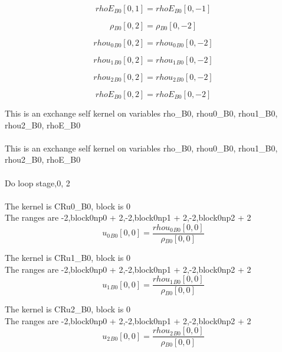\documentclass{article}
\begin{document}
\begin{dmath}{rhoE{_{B0}}}[{0,1}] = {rhoE{_{B0}}}[{0,-1}]\end{dmath}

\begin{dmath}{\rho{_{B0}}}[{0,2}] = {\rho{_{B0}}}[{0,-2}]\end{dmath}

\begin{dmath}{rhou_{0}{_{B0}}}[{0,2}] = {rhou_{0}{_{B0}}}[{0,-2}]\end{dmath}

\begin{dmath}{rhou_{1}{_{B0}}}[{0,2}] = {rhou_{1}{_{B0}}}[{0,-2}]\end{dmath}

\begin{dmath}{rhou_{2}{_{B0}}}[{0,2}] = {rhou_{2}{_{B0}}}[{0,-2}]\end{dmath}

\begin{dmath}{rhoE{_{B0}}}[{0,2}] = {rhoE{_{B0}}}[{0,-2}]\end{dmath}

\noindent This is an exchange self kernel on variables rho_B0, rhou0_B0, rhou1_B0, rhou2_B0, rhoE_B0\\\\\noindent This is an exchange self kernel on variables rho_B0, rhou0_B0, rhou1_B0, rhou2_B0, rhoE_B0\\\\\noindent Do loop stage,0, 2\\
\\\noindent The kernel is CRu0_B0, block is 0\\\noindent The ranges are -2,block0np0 + 2,-2,block0np1 + 2,-2,block0np2 + 2\\\begin{dmath}{u_{0}{_{B0}}}[{0,0}] = \frac{{rhou_{0}{_{B0}}}[{0,0}]}{{\rho{_{B0}}}[{0,0}]}\end{dmath}

\noindent The kernel is CRu1_B0, block is 0\\\noindent The ranges are -2,block0np0 + 2,-2,block0np1 + 2,-2,block0np2 + 2\\\begin{dmath}{u_{1}{_{B0}}}[{0,0}] = \frac{{rhou_{1}{_{B0}}}[{0,0}]}{{\rho{_{B0}}}[{0,0}]}\end{dmath}

\noindent The kernel is CRu2_B0, block is 0\\\noindent The ranges are -2,block0np0 + 2,-2,block0np1 + 2,-2,block0np2 + 2\\\begin{dmath}{u_{2}{_{B0}}}[{0,0}] = \frac{{rhou_{2}{_{B0}}}[{0,0}]}{{\rho{_{B0}}}[{0,0}]}\end{dmath}
\end{document}
